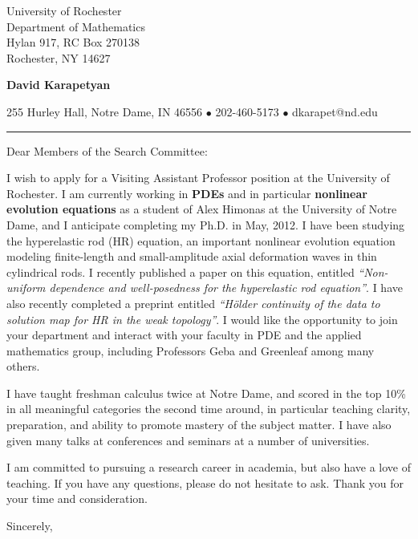 \documentclass[12pt]{letter}
\date{\vspace{0.5cm}\flushleft \today}
\begin{document}
\begin{letter}{University of Rochester \\
Department of Mathematics \\
Hylan 917, RC Box 270138 \\
Rochester, NY 14627}
        \begin{center}
{\bf {\Large David Karapetyan}}
\end{center}

\begin{center}
{255 Hurley Hall, Notre Dame, IN 46556  $\bullet$
202-460-5173 $\bullet$ dkarapet@nd.edu
}
\end{center}
\hrule

\opening{Dear Members of the Search Committee:\\}
%
%
I wish to apply for a Visiting Assistant Professor position at the University of
Rochester. I am currently working in \textbf{PDEs} and in
particular \textbf{nonlinear evolution equations} as a student of Alex Himonas
at the University of Notre Dame, and I anticipate
completing my Ph.D. in May, 2012. I have been studying the hyperelastic rod (HR)
equation, an important nonlinear evolution equation modeling finite-length and
small-amplitude axial deformation waves in thin cylindrical rods. I recently
published a paper on this equation, entitled {\it ``Non-uniform dependence and
well-posedness for the hyperelastic rod equation''}. I have also recently
completed a preprint entitled {\it ``H\"older continuity of the data to solution
map for HR in the weak topology''}. I would like the opportunity to join your
department and interact with your faculty in PDE and the applied mathematics
group, including Professors Geba and Greenleaf among many others.

I have taught freshman calculus twice at Notre Dame, and scored in the top 10\%
in all meaningful categories the second time around, in particular teaching
clarity, preparation, and ability to promote mastery of the subject matter. I
have also given many talks at conferences and seminars at a number of
universities. 

I am committed to pursuing a research career in academia, but also have a love
of teaching. If you have any questions, please do not hesitate to ask. Thank you for your time and consideration. 

\closing{Sincerely,}


\end{letter}
\end{document}
